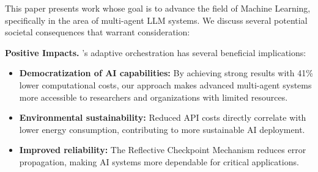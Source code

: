 \documentclass{article}
\theoremstyle{plain}
\theoremstyle{definition}
\theoremstyle{remark}
\begin{document}
%
%
This paper presents work whose goal is to advance the field of Machine Learning, specifically in the area of multi-agent LLM systems. We discuss several potential societal consequences that warrant consideration:

\textbf{Positive Impacts.} \amore{}'s adaptive orchestration has several beneficial implications:
\begin{itemize}[nosep,leftmargin=*]
	\item \textbf{Democratization of AI capabilities:} By achieving strong results with 41\% lower computational costs, our approach makes advanced multi-agent systems more accessible to researchers and organizations with limited resources.
	\item \textbf{Environmental sustainability:} Reduced API costs directly correlate with lower energy consumption, contributing to more sustainable AI deployment.
	\item \textbf{Improved reliability:} The Reflective Checkpoint Mechanism reduces error propagation, making AI systems more dependable for critical applications.
\end{itemize}
\end{document}
